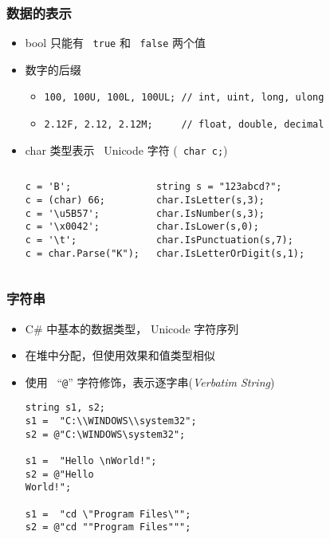 \begin{frame}[fragile]
\frametitle{数据的表示}

\begin{itemize}
\item bool 只能有 ~\lstinline|true| 和 ~\lstinline|false| 两个值 \pause
\item 数字的后缀
  \begin{itemize}
  \item \lstinline|100, 100U, 100L, 100UL; // int, uint, long, ulong|
  \item \lstinline|2.12F, 2.12, 2.12M;     // float, double, decimal|
  \end{itemize}
\pause
\item char 类型表示 ~Unicode 字符 (\lstinline| char c;|)
  \begin{columns}
\begin{lstlisting}
c = 'B';
c = (char) 66;
c = '\u5B57';
c = '\x0042';
c = '\t';
c = char.Parse("K");
\end{lstlisting}
\begin{lstlisting}
string s = "123abcd?";
char.IsLetter(s,3);
char.IsNumber(s,3);
char.IsLower(s,0);
char.IsPunctuation(s,7);
char.IsLetterOrDigit(s,1);
\end{lstlisting}
  \end{columns}
\end{itemize}
\end{frame}

\begin{frame}[fragile]
\frametitle{字符串}
\begin{itemize}
\item C\# 中基本的数据类型， Unicode 字符序列\pause
\item 在堆中分配，但使用效果和值类型相似\pause
\item 使用 ~``\texttt{@}'' 字符修饰，表示{\redwarn 逐字串}(\textit{Verbatim String})
\begin{lstlisting}
string s1, s2;
s1 =  "C:\\WINDOWS\\system32";
s2 = @"C:\WINDOWS\system32";

s1 =  "Hello \nWorld!";
s2 = @"Hello
World!";

s1 =  "cd \"Program Files\"";
s2 = @"cd ""Program Files""";
\end{lstlisting}
\end{itemize}
\end{frame}

